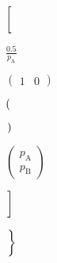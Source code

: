\documentclass[a4paper,11pt,twoside,openright]{book}
\def\lthtmlcheckvsize{\ifdim\ht\sizebox<\vsize 
  \ifdim\wd\sizebox<\hsize\expandafter\hfill\fi \expandafter\vfill
  \else\expandafter\vss\fi}%
\begin{document}
{\newpage\clearpage
{}%
$\displaystyle \left[\vphantom{ \frac{0.5}{p_{\textrm{A}}}
\begin{pmatrix}1&0\end{pmatrix} \cdot \left( \mathbf{AB} + \mathbf{CD} \right) \cdot \begin{pmatrix}p_{\textrm{A}}\\ p_{\textrm{B}}\end{pmatrix}
}\right.$%
\lthtmlindisplaymathZ
\lthtmlcheckvsize\clearpage}

{\newpage\clearpage
{}%
$\displaystyle {\frac{{0.5}}{{p_{\textrm{A}}}}}$%
\lthtmlindisplaymathZ
\lthtmlcheckvsize\clearpage}

{\newpage\clearpage
{}%
$\displaystyle \begin{pmatrix}1&0\end{pmatrix}$%
\lthtmlindisplaymathZ
\lthtmlcheckvsize\clearpage}

{\newpage\clearpage
{}%
$\displaystyle \left(\vphantom{ \mathbf{AB} + \mathbf{CD} }\right.$%
\lthtmlindisplaymathZ
\lthtmlcheckvsize\clearpage}

{\newpage\clearpage
{}%
$\displaystyle \left.\vphantom{ \mathbf{AB} + \mathbf{CD} }\right)$%
\lthtmlindisplaymathZ
\lthtmlcheckvsize\clearpage}

{\newpage\clearpage
{}%
$\displaystyle \begin{pmatrix}p_{\textrm{A}}\\ p_{\textrm{B}}\end{pmatrix}$%
\lthtmlindisplaymathZ
\lthtmlcheckvsize\clearpage}

{\newpage\clearpage
{}%
$\displaystyle \left.\vphantom{ \frac{0.5}{p_{\textrm{A}}}
\begin{pmatrix}1&0\end{pmatrix} \cdot \left( \mathbf{AB} + \mathbf{CD} \right) \cdot \begin{pmatrix}p_{\textrm{A}}\\ p_{\textrm{B}}\end{pmatrix}
}\right]$%
\lthtmlindisplaymathZ
\lthtmlcheckvsize\clearpage}

{\newpage\clearpage
{}%
$\displaystyle \left.\vphantom{ Re \left[ \frac{0.5}{p_{\textrm{A}}}
\begin{pmatrix}1&0\end{pmatrix} \cdot \left( \mathbf{AB} + \mathbf{CD} \right) \cdot \begin{pmatrix}p_{\textrm{A}}\\ p_{\textrm{B}}\end{pmatrix}
\right] }\right\}$%
\lthtmlindisplaymathZ
\lthtmlcheckvsize\clearpage}
\end{document}
